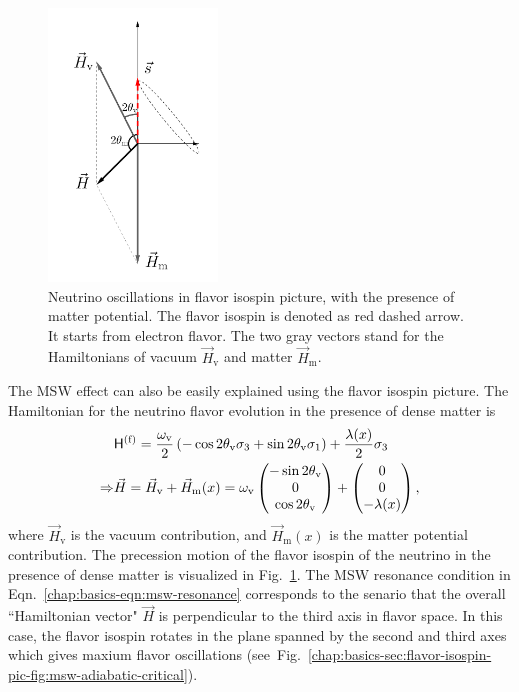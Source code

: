 \begin{figure}[htbp]
    \centering
    \includegraphics[width=0.4\textwidth]{chapters/assets/matter/matter-effect-notsolarge-density}
    \caption{Neutrino oscillations in flavor isospin picture, with the presence of matter potential. The flavor isospin is denoted as red dashed arrow. It starts from electron flavor. The two gray vectors stand for the Hamiltonians of vacuum $\vec H_{\mathrm v}$ and matter $\vec H_{\mathrm m}$.}
    \label{chap:basics-sec:flavor-isospin-pic-fig:matter-effect-notsolarge-density}
\end{figure}

The MSW effect can also be easily explained using the flavor isospin picture. The Hamiltonian for the neutrino flavor evolution in the presence of dense matter is
\begin{align*}
    &\mathsf H^{(\mathrm f)} =  \frac{\omega_{\mathrm{v}}}{2}\left( - \cos 2\theta_{\mathrm{v}} {\sigma_3} + \sin 2\theta_{\mathrm{v}} {\sigma_1} \right)   + \frac{\lambda(x)}{2} {\sigma_3} \\
    \Rightarrow &\vec H =  \vec H_{\mathrm v} + \vec H_{\mathrm m}(x)
     = \omega_{\mathrm v}\begin{pmatrix}
    - \sin 2\theta_{\mathrm v} \\
    0 \\
    \cos 2\theta_{\mathrm v}
    \end{pmatrix}   + \begin{pmatrix}
    0\\
    0\\
    - \lambda(x)
    \end{pmatrix}  ,
\end{align*}
where $\vec H_{\mathrm v}$ is the vacuum contribution, and $\vec H_{\mathrm m}(x)$ is the matter potential contribution. The precession motion of the flavor isospin of the neutrino in the presence of dense matter is visualized in Fig.~\ref{chap:basics-sec:flavor-isospin-pic-fig:matter-effect-notsolarge-density}. The MSW resonance condition in Eqn.~\ref{chap:basics-eqn:msw-resonance} corresponds to the senario that the overall ``Hamiltonian vector" $\vec H$ is perpendicular to the third axis in flavor space. In this case, the flavor isospin rotates in the plane spanned by the second and third axes which gives maxium flavor oscillations (see~Fig.~\ref{chap:basics-sec:flavor-isospin-pic-fig:msw-adiabatic-critical}).

